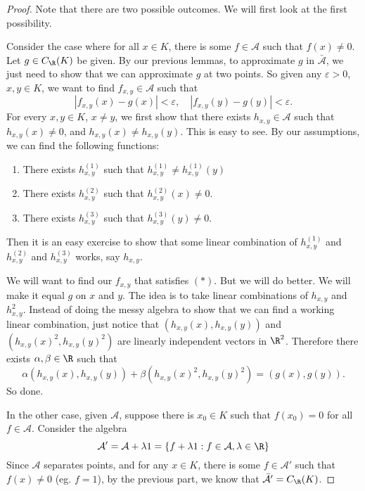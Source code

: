 \documentclass[a4paper]{article}
\begin{document}
\begin{proof}
  Note that there are two possible outcomes. We will first look at the first possibility.

  Consider the case where for all $x \in K$, there is some $f \in \mathcal{A}$ such that $f(x) \not= 0$. Let $g \in C_{\R}(K)$ be given. By our previous lemmas, to approximate $g$ in $\bar{\mathcal{A}}$, we just need to show that we can approximate $g$ at two points. So given any $\varepsilon > 0$, $x, y \in K$, we want to find $f_{x, y} \in \mathcal{A}$ such that
  \[
    |f_{x, y}(x) - g(x)| < \varepsilon,\quad |f_{x, y}(y) - g(y)| < \varepsilon. \tag{$*$}
  \]
  For every $x, y \in K$, $x \not= y$, we first show that there exists $h_{x, y} \in \mathcal{A}$ such that $h_{x, y}(x) \not= 0$, and $h_{x, y}(x) \not= h_{x, y}(y)$. This is easy to see. By our assumptions, we can find the following functions:
  \begin{enumerate}
    \item There exists $h_{x, y}^{(1)}$ such that $h_{x, y}^{(1)} \not= h_{x, y}^{(1)}(y)$
    \item There exists $h_{x, y}^{(2)}$ such that $h_{x, y}^{(2)}(x) \not= 0$.
    \item There exists $h_{x, y}^{(3)}$ such that $h_{x, y}^{(3)}(y) \not= 0$.
  \end{enumerate}
  Then it is an easy exercise to show that some linear combination of $h_{x, y}^{(1)}$ and $h_{x, y}^{(2)}$ and $h_{x, y}^{(3)}$ works, say $h_{x, y}$.

  We will want to find our $f_{x, y}$ that satisfies $(*)$. But we will do better. We will make it equal $g$ on $x$ and $y$. The idea is to take linear combinations of $h_{x, y}$ and $h_{x, y}^2$. Instead of doing the messy algebra to show that we can find a working linear combination, just notice that $(h_{x, y}(x), h_{x, y}(y))$ and $(h_{x, y}(x)^2, h_{x, y}(y)^2)$ are linearly independent vectors in $\R^2$. Therefore there exists $\alpha, \beta \in \R$ such that
  \[
    \alpha(h_{x, y}(x), h_{x, y}(y)) + \beta(h_{x, y}(x)^2, h_{x, y}(y)^2) = (g(x), g(y)).
  \]
  So done.

  In the other case, given $\mathcal{A}$, suppose there is $x_0 \in K$ such that $f(x_0) = 0$ for all $f \in \mathcal{A}$. Consider the algebra
  \[
    \mathcal{A}' = \mathcal{A} + \lambda 1 = \{f + \lambda 1: f \in \mathcal{A}, \lambda \in \R\}
  \]
  Since $\mathcal{A}$ separates points, and for any $x \in K$, there is some $f \in \mathcal{A}'$ such that $f(x) \not= 0$ (eg. $f = 1$), by the previous part, we know that $\bar{\mathcal{A}}' = C_{\R}(K)$.


\end{proof}
\end{document}
